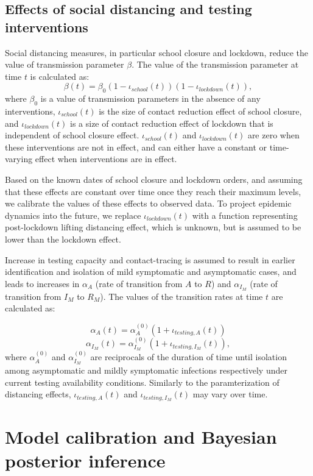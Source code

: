 \documentclass[11pt]{article}
\begin{document}
\subsection{Effects of social distancing and testing interventions} 
Social distancing measures, in particular school closure and lockdown, reduce the value of transmission parameter $\beta$. The value of the transmission parameter at time $t$ is calculated as:
\[ \beta(t) = \beta_0 (1 - \iota_{school}(t) ) (1 - \iota_{lockdown} (t) ), \]
where $\beta_0$ is a value of transmission parameters in the absence of any interventions, $\iota_{school}(t)$ is the size of contact reduction effect of school closure, and $\iota_{lockdown} (t)$ is a size of contact reduction effect of lockdown that is independent of school closure effect. $\iota_{school}(t)$ and $\iota_{lockdown} (t)$ are zero when these interventions are not in effect, and can either have a constant or time-varying effect when interventions are in effect. 

Based on the known dates of school closure and lockdown orders, and assuming that these effects are constant over time once they reach their maximum levels, we calibrate the values of these effects to observed data. To project epidemic dynamics into the future, we replace  $\iota_{lockdown} (t)$ with a function representing post-lockdown lifting distancing effect, which is unknown, but is assumed to be lower than the lockdown effect. 

Increase in testing capacity and contact-tracing is assumed to result in earlier identification and isolation of mild symptomatic and asymptomatic cases, and leads to increases in $\alpha_A$ (rate of transition from $A$ to $R$) and $\alpha_{I_M}$ (rate of transition from $I_M$ to $R_M$). The values of the transition rates at time $t$ are calculated as:

\[ \alpha_A(t) = \alpha_A^{(0)} (1 + \iota_{testing,A} (t)) \]
\[ \alpha_{I_M}(t) = \alpha_{I_M}^{(0)} (1 + \iota_{testing,{I_M}} (t)), \]
where $\alpha_A^{(0)}$ and $\alpha_{I_M}^{(0)}$ are reciprocals of the duration of time until isolation among asymptomatic and mildly symptomatic infections respectively under current testing availability conditions. Similarly to the paramterization of distancing effects, $\iota_{testing,A} (t)$ and $\iota_{testing,{I_M}} (t)$ may vary over time.





\section{Model calibration and Bayesian posterior inference}
\end{document}
